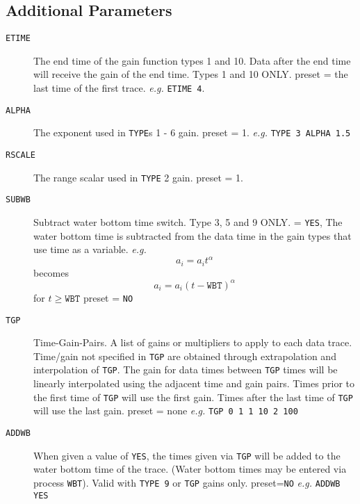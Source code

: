 \subsection{Additional Parameters}

\begin{description}
\item[\texttt{ETIME}] The end time of the gain function types 1 and 10.  Data after the end
         time will receive the gain of the end time.  Types 1 and 10 ONLY.
         \Gls{preset} = the last time of the first trace.   \textit{e.g.}  \texttt{ETIME 4}.

\item[\texttt{ALPHA}] The exponent used in \texttt{TYPE}s 1 - 6 gain.
         \Gls{preset} = 1.   \textit{e.g.}  \texttt{TYPE 3 ALPHA 1.5}

\item[\texttt{RSCALE}] The range scalar used in \texttt{TYPE} 2 gain.
         \Gls{preset} = 1.

\item[\texttt{SUBWB}] Subtract water bottom time switch.  Type 3, 5 and 9 ONLY.
       = \texttt{YES}, The water bottom time is subtracted from the data time in
         the gain types that use time as a variable.  \textit{e.g.}
\begin{equation}
a_{i} = a_{i} t^{\alpha}
\end{equation}
               becomes
\begin{equation}
a_{i} = a_{i} \left(t - \texttt{WBT}\right)^{\alpha}
\end{equation}
        for $t \geq \texttt{WBT}$
         \Gls{preset} = \texttt{NO}

\item[\texttt{TGP}] Time-Gain-Pairs.  A list of gains or multipliers to apply
         to each data trace.  Time/gain not specified in \texttt{TGP} are
         obtained through extrapolation and interpolation of \texttt{TGP}.
         The gain for data times between \texttt{TGP} times will be linearly
         interpolated using the adjacent time and gain pairs.
         Times prior to the first time of \texttt{TGP} will use the first gain.
         Times after the last time of \texttt{TGP} will use the last gain.
         \Gls{preset} = none     \textit{e.g.} \texttt{TGP 0 1 1 10 2 100}

\item[\texttt{ADDWB}] When given a value of \texttt{YES}, the times given via \texttt{TGP}
         will be added to the water bottom time of the trace.
         (Water bottom times may be entered via process \texttt{WBT}).
         Valid with \texttt{TYPE 9} or \texttt{TGP} gains only.
         \Gls{preset}=\texttt{NO} \textit{e.g.}   \texttt{ADDWB YES}


\end{description}

